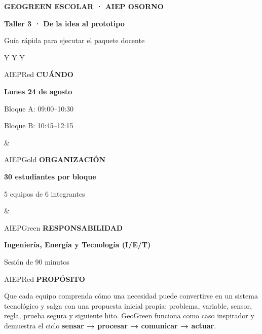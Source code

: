 \documentclass[9.5pt,a4paper]{article}
\newcommand{\labelx}[1]{{\scriptsize\bfseries\color{AIEPRed}\MakeUppercase{#1}}\par}
\begin{document}
\begin{tcolorbox}[colback=AIEPNavy,colframe=AIEPNavy,arc=1.5mm,left=5mm,right=5mm,top=4mm,bottom=4mm]
{\small\bfseries\color{white}GEOGREEN ESCOLAR · AIEP OSORNO}\par
{\LARGE\bfseries\color{white}Taller 3 · De la idea al prototipo}\par
{\normalsize\color{white}Guía rápida para ejecutar el paquete docente}
\end{tcolorbox}

\begin{tabularx}{\textwidth}{Y Y Y}
\begin{boxa}[height=28mm,valign=top]{AIEPRed}
\labelx{Cuándo}
\textbf{Lunes 24 de agosto}\par
Bloque A: 09:00–10:30\par
Bloque B: 10:45–12:15
\end{boxa}
&
\begin{boxa}[height=28mm,valign=top]{AIEPGold}
\labelx{Organización}
\textbf{30 estudiantes por bloque}\par
5 equipos de 6 integrantes
\end{boxa}
&
\begin{boxa}[height=28mm,valign=top]{AIEPGreen}
\labelx{Responsabilidad}
\textbf{Ingeniería, Energía y Tecnología (I/E/T)}\par
Sesión de 90 minutos
\end{boxa}
\end{tabularx}

\begin{boxa}{AIEPRed}
\labelx{Propósito}
Que cada equipo comprenda cómo una necesidad puede convertirse en un sistema tecnológico y salga con
una propuesta inicial propia: problema, variable, sensor, regla, prueba segura y siguiente hito.
GeoGreen funciona como caso inspirador y demuestra el ciclo \textbf{sensar → procesar → comunicar → actuar}.
\end{boxa}
\end{document}
